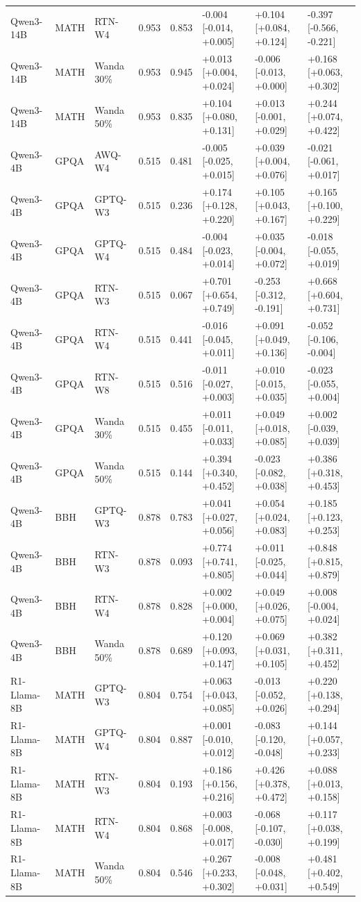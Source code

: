 \begin{tabular}{lllrrlll}
Qwen3-14B & MATH & RTN-W4 & 0.953 & 0.853 & -0.004 [-0.014, +0.005] & +0.104 [+0.084, +0.124] & -0.397 [-0.566, -0.221] \\
Qwen3-14B & MATH & Wanda 30\% & 0.953 & 0.945 & +0.013 [+0.004, +0.024] & -0.006 [-0.013, +0.000] & +0.168 [+0.063, +0.302] \\
Qwen3-14B & MATH & Wanda 50\% & 0.953 & 0.835 & +0.104 [+0.080, +0.131] & +0.013 [-0.001, +0.029] & +0.244 [+0.074, +0.422] \\
Qwen3-4B & GPQA & AWQ-W4 & 0.515 & 0.481 & -0.005 [-0.025, +0.015] & +0.039 [+0.004, +0.076] & -0.021 [-0.061, +0.017] \\
Qwen3-4B & GPQA & GPTQ-W3 & 0.515 & 0.236 & +0.174 [+0.128, +0.220] & +0.105 [+0.043, +0.167] & +0.165 [+0.100, +0.229] \\
Qwen3-4B & GPQA & GPTQ-W4 & 0.515 & 0.484 & -0.004 [-0.023, +0.014] & +0.035 [-0.004, +0.072] & -0.018 [-0.055, +0.019] \\
Qwen3-4B & GPQA & RTN-W3 & 0.515 & 0.067 & +0.701 [+0.654, +0.749] & -0.253 [-0.312, -0.191] & +0.668 [+0.604, +0.731] \\
Qwen3-4B & GPQA & RTN-W4 & 0.515 & 0.441 & -0.016 [-0.045, +0.011] & +0.091 [+0.049, +0.136] & -0.052 [-0.106, -0.004] \\
Qwen3-4B & GPQA & RTN-W8 & 0.515 & 0.516 & -0.011 [-0.027, +0.003] & +0.010 [-0.015, +0.035] & -0.023 [-0.055, +0.004] \\
Qwen3-4B & GPQA & Wanda 30\% & 0.515 & 0.455 & +0.011 [-0.011, +0.033] & +0.049 [+0.018, +0.085] & +0.002 [-0.039, +0.039] \\
Qwen3-4B & GPQA & Wanda 50\% & 0.515 & 0.144 & +0.394 [+0.340, +0.452] & -0.023 [-0.082, +0.038] & +0.386 [+0.318, +0.453] \\
Qwen3-4B & BBH & GPTQ-W3 & 0.878 & 0.783 & +0.041 [+0.027, +0.056] & +0.054 [+0.024, +0.083] & +0.185 [+0.123, +0.253] \\
Qwen3-4B & BBH & RTN-W3 & 0.878 & 0.093 & +0.774 [+0.741, +0.805] & +0.011 [-0.025, +0.044] & +0.848 [+0.815, +0.879] \\
Qwen3-4B & BBH & RTN-W4 & 0.878 & 0.828 & +0.002 [+0.000, +0.004] & +0.049 [+0.026, +0.075] & +0.008 [-0.004, +0.024] \\
Qwen3-4B & BBH & Wanda 50\% & 0.878 & 0.689 & +0.120 [+0.093, +0.147] & +0.069 [+0.031, +0.105] & +0.382 [+0.311, +0.452] \\
R1-Llama-8B & MATH & GPTQ-W3 & 0.804 & 0.754 & +0.063 [+0.043, +0.085] & -0.013 [-0.052, +0.026] & +0.220 [+0.138, +0.294] \\
R1-Llama-8B & MATH & GPTQ-W4 & 0.804 & 0.887 & +0.001 [-0.010, +0.012] & -0.083 [-0.120, -0.048] & +0.144 [+0.057, +0.233] \\
R1-Llama-8B & MATH & RTN-W3 & 0.804 & 0.193 & +0.186 [+0.156, +0.216] & +0.426 [+0.378, +0.472] & +0.088 [+0.013, +0.158] \\
R1-Llama-8B & MATH & RTN-W4 & 0.804 & 0.868 & +0.003 [-0.008, +0.017] & -0.068 [-0.107, -0.030] & +0.117 [+0.038, +0.199] \\
R1-Llama-8B & MATH & Wanda 50\% & 0.804 & 0.546 & +0.267 [+0.233, +0.302] & -0.008 [-0.048, +0.031] & +0.481 [+0.402, +0.549] \\
\bottomrule
\end{tabular}
